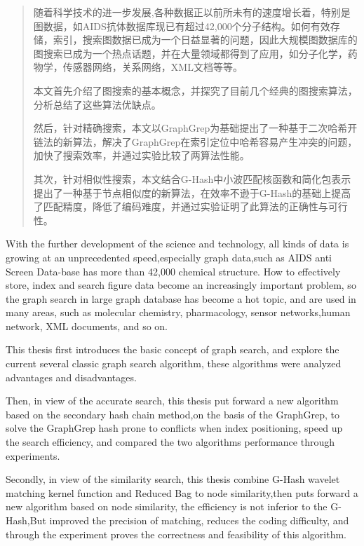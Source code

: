\documentclass{XDBAthesis}
\begin{document}
\else
\fi
\begin{abstract}
    随着科学技术的进一步发展,各种数据正以前所未有的速度增长着，特别是图数据，如AIDS抗体数据库现已有超过42,000个分子结构。如何有效存储，索引，搜索图数据已成为一个日益显著的问题，因此大规模图数据库的图搜索已成为一个热点话题，并在大量领域都得到了应用，如分子化学，药物学，传感器网络，关系网络，XML文档等等。
    
    本文首先介绍了图搜索的基本概念，并探究了目前几个经典的图搜索算法，分析总结了这些算法优缺点。
    
    然后，针对精确搜索，本文以GraphGrep为基础提出了一种基于二次哈希开链法的新算法，解决了GraphGrep在索引定位中哈希容易产生冲突的问题，加快了搜索效率，并通过实验比较了两算法性能。
    
    其次，针对相似性搜索，本文结合G-Hash中小波匹配核函数和简化包表示提出了一种基于节点相似度的新算法，在效率不逊于G-Hash的基础上提高了匹配精度，降低了编码难度，并通过实验证明了此算法的正确性与可行性。
    
    
\end{abstract}
\begin{englishabstract}
With the further development of the science and technology, all kinds of data is growing at an unprecedented speed,especially graph data,such as AIDS anti Screen Data-base has more than 42,000 chemical structure.  How to effectively store, index and search figure data become an increasingly important problem, so the graph search in large graph database has become a hot topic, and are used in many areas, such as molecular chemistry, pharmacology, sensor networks,human network, XML documents, and so on.

This thesis first introduces the basic concept of graph search, and explore the current several classic graph search algorithm, these algorithms were analyzed advantages and disadvantages.

Then, in view of the accurate search, this thesis put forward a new algorithm based on the secondary hash chain method,on the basis of the GraphGrep, to solve the GraphGrep hash prone to conflicts when index positioning, speed up the search efficiency, and compared the two algorithms performance through experiments.

Secondly, in view of the similarity search, this thesis combine G-Hash wavelet matching kernel function and Reduced Bag to node similarity,then puts forward a new algorithm based on node similarity, the efficiency is not inferior to the G-Hash,But improved the precision of matching, reduces the coding difficulty, and through the experiment proves the correctness and feasibility of this algorithm.

\end{englishabstract}



\ifx\allfiles\undefined
%
%
\end{document}
